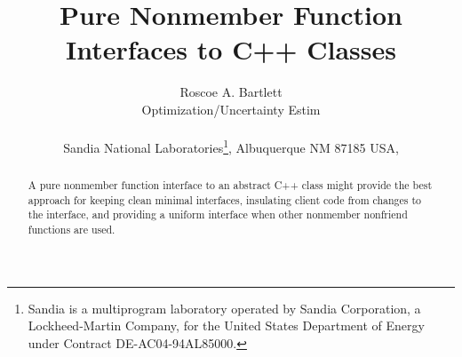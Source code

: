 \documentclass[pdf,ps2pdf,11pt]{SANDreport}
\title{\center
Pure Nonmember Function Interfaces to C++ Classes}
\author{
Roscoe A. Bartlett \\ Optimization/Uncertainty Estim \\ \\ Sandia National
Laboratories\footnote{ Sandia is a multiprogram laboratory operated by Sandia
Corporation, a Lockheed-Martin Company, for the United States Department of
Energy under Contract DE-AC04-94AL85000.}, Albuquerque NM 87185 USA, \\ }
\date{}
\begin{document}
\maketitle

%

%
\begin{abstract}
%
A pure nonmember function interface to an abstract C++ class might provide the
best approach for keeping clean minimal interfaces, insulating client code
from changes to the interface, and providing a uniform interface when other
nonmember nonfriend functions are used.
%
\end{abstract}
%

%
%
%

%
\clearpage
\tableofcontents


\end{document}
